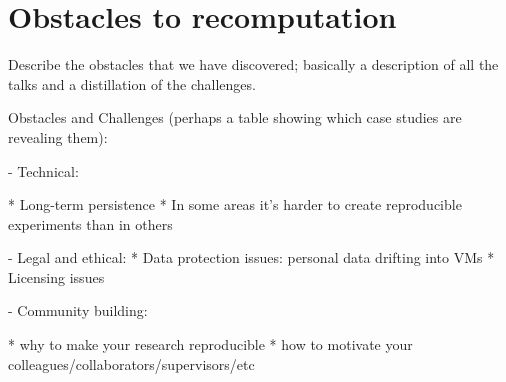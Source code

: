 \section{Obstacles to recomputation}
\label{s:obstacles}

Describe the obstacles that we have discovered; basically a
description of all the talks and a distillation of the challenges.

Obstacles and Challenges (perhaps a table showing which case studies
are revealing them):

- Technical:
 
  * Long-term persistence
  * In some areas it's harder to create reproducible experiments than in others

- Legal and ethical:
  * Data protection issues: personal data drifting into VMs
  * Licensing issues

- Community building:

  * why to make your research reproducible
  * how to motivate your colleagues/collaborators/supervisors/etc
  





